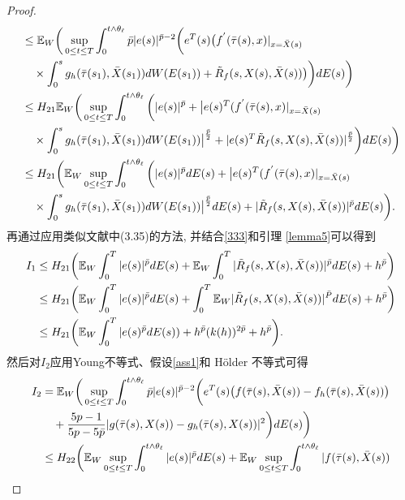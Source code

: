 \begin{proof}
\begin{align}
    &\leq  \mathbb{E}_W\bigg(\sup_{0\leq t\leq T}\int^{t\wedge\theta_{\ell}}_{0}\bar{p}|e(s)|^{\bar{p}-2}\bigg(e^{T}(s)\big(f^{'}(\bar{\tau}(s),x)|_{x=\bar{X}(s)}\nonumber\\
    &\quad \times \int^{s}_{0}g_h(\bar{\tau}(s_{1}),\bar{X}(s_{1}))dW(E(s_{1}))+\tilde{R}_{f}(s,X(s),\bar{X}(s))\big)\bigg)dE(s)\bigg)\nonumber\\
    &\leq 
    H_{21}\mathbb{E}_W\bigg(\sup_{0\leq t\leq T}\int^{t\wedge\theta_{\ell}}_{0}\bigg(|e(s)|^{\bar{p}}+\big|e(s)^{T}(f^{'}(\bar{\tau}(s),x)|_{x=\bar{X}(s)}\nonumber\\
    &\quad \times \int^{s}_{0}g_h(\bar{\tau}(s_{1}),\bar{X}(s_{1}))dW(E(s_{1}))\big|^{\frac{\bar{p}}{2}}+|e(s)^{T}\tilde{R}_{f}(s,X(s),\bar{X}(s))|^{{\frac{\bar{p}}{2}}}\bigg)dE(s)\bigg)\nonumber\\
    &\leq  H_{21}\bigg(\mathbb{E}_W\sup_{0\leq t\leq T}\int^{t\wedge\theta_{\ell}}_{0}\bigg(|e(s)|^{\bar{p}}dE(s)+\big|e(s)^{T}(f^{'}(\bar{\tau}(s),x)|_{x=\bar{X}(s)}\nonumber\\
    &\quad \times \int^{s}_{0}g_h(\bar{\tau}(s_{1}),\bar{X}(s_{1}))dW(E(s_{1}))\big|^{\frac{\bar{p}}{2}}dE(s)+|\tilde{R}_{f}(s,X(s),\bar{X}(s))|^{\bar{p}}dE(s)\bigg).   
\end{align}
再通过应用类似文献\cite{Wang2013466}中(3.35)的方法, 并结合\eqref{333}和引理 \ref{lemma5}可以得到
\begin{align}
    \label{335}
    I_{1}&\leq H_{21}\bigg(\mathbb{E}_{W}\int^{T}_{0}|e(s)|^{\bar{p}}dE(s)+\mathbb{E}_{W}\int^{T}_{0}|\tilde{R}_{f}(s,X(s),\bar{X}(s))|^{\bar{p}}dE(s)+h^{\bar{p}}\bigg)\nonumber\\
    &\leq 
    H_{21}\bigg(\mathbb{E}_{W}\int^{T}_{0}|e(s)|^{\bar{p}}dE(s)+\int^{T}_{0}\mathbb{E}_{W}|\tilde{R}_{f}(s,X(s),\bar{X}(s))|^{\bar{P}}dE(s)+h^{\bar{p}}\bigg)\nonumber\\
    &\leq 
    H_{21}\bigg(\mathbb{E}_{W}\int^{T}_{0}|e(s)^{\bar{p}}dE(s))+h^{\bar{p}}(k(h))^{2\bar{p}}+h^{\bar{p}}\bigg).
\end{align} 
然后对$I_2$应用Young不等式、假设\ref{ass1}和 H{\"o}lder 不等式可得
 \begin{align*}
     I_{2}&=\EE_{W}\bigg(\sup_{0\leq t\leq T}\int^{t\wedge\theta_{\ell}}_{0}\bar{p}|e(s)|^{\bar{p}-2}\bigg(e^{T}(s)\big(f(\bar{\tau}(s),\bar{X}(s))-f_h(\bar{\tau}(s),\bar{X}(s))\big)\\
     &\quad+\dfrac{5p-1}{5p-5\bar{p}}|g(\bar{\tau}(s),X(s))-g_h(\bar{\tau}(s),X(s))|^2\bigg)dE(s)\bigg)\\
     &\leq 
     H_{22}\bigg(\EE_{W}\sup_{0\leq t\leq T}\int^{t\wedge\theta_{\ell}}_{0}|e(s)|^{\bar{p}}dE(s)+\EE_{W}\sup_{0\leq t\leq T}\int^{t\wedge\theta_{\ell}}_{0}|f(\bar{\tau}(s),\bar{X}(s))\\

\end{align*}
\end{proof}
